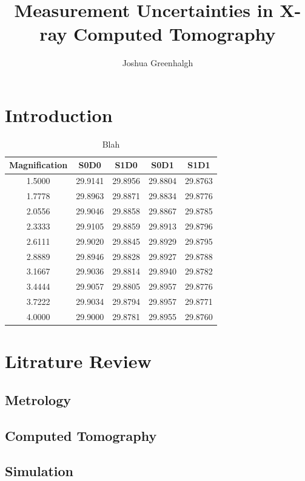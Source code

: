 \documentclass[
  twoside,
  11pt, a4paper,
  footinclude=true,
  headinclude=true,
  cleardoublepage=empty
]{scrbook}
\title{Measurement Uncertainties in X-ray Computed Tomography}
\author{Joshua Greenhalgh}
\begin{document}
\maketitle





\chapter{Introduction}

\begin{table}
\caption{Blah}
\begin{tabular}{c|cccc}
\toprule
{} Magnification &     S0D0 &     S1D0 &     S0D1 &     S1D1 \\
\midrule
1.5000        &  29.9141 &  29.8956 &  29.8804 &  29.8763 \\
1.7778        &  29.8963 &  29.8871 &  29.8834 &  29.8776 \\
2.0556        &  29.9046 &  29.8858 &  29.8867 &  29.8785 \\
2.3333        &  29.9105 &  29.8859 &  29.8913 &  29.8796 \\
2.6111        &  29.9020 &  29.8845 &  29.8929 &  29.8795 \\
2.8889        &  29.8946 &  29.8828 &  29.8927 &  29.8788 \\
3.1667        &  29.9036 &  29.8814 &  29.8940 &  29.8782 \\
3.4444        &  29.9057 &  29.8805 &  29.8957 &  29.8776 \\
3.7222        &  29.9034 &  29.8794 &  29.8957 &  29.8771 \\
4.0000        &  29.9000 &  29.8781 &  29.8955 &  29.8760 \\
\bottomrule
\end{tabular}
\end{table}

\chapter{Litrature Review}
\section{Metrology}
\section{Computed Tomography}
\section{Simulation}
\end{document}
